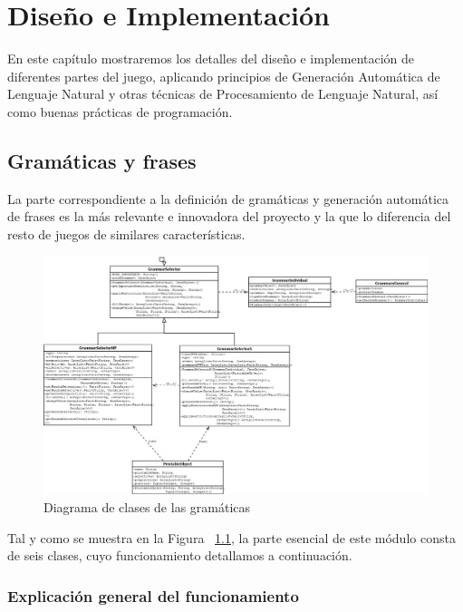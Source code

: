 \chapter{Diseño e Implementación}

En este capítulo mostraremos los detalles del diseño e implementación de diferentes partes del juego, aplicando principios de Generación Automática de Lenguaje Natural \cite{Reiter_and_Dale_2000b} y otras técnicas de Procesamiento de Lenguaje Natural,\cite{JurMar2009a}\cite{book:statisticalfoundations} así como buenas prácticas de programación\cite{Nystrom2014a}.

\section{Gramáticas y frases}

La parte correspondiente a la definición de gramáticas y generación automática de frases es la más relevante e innovadora del proyecto y la que lo diferencia del resto de juegos de similares características.

\begin{figure}
    \includegraphics[width=1.5\textwidth,height=1.5\textheight,keepaspectratio,angle=90]{./img/grammarDiagram.png}
  \caption{Diagrama de clases de las gramáticas}
  \label{fig:clasesgramaticas}
\end{figure}

Tal y como se muestra en la Figura ~\ref{fig:clasesgramaticas}, la parte esencial de este módulo consta de seis clases, cuyo funcionamiento detallamos a continuación.

\subsection{Explicación general del funcionamiento}

